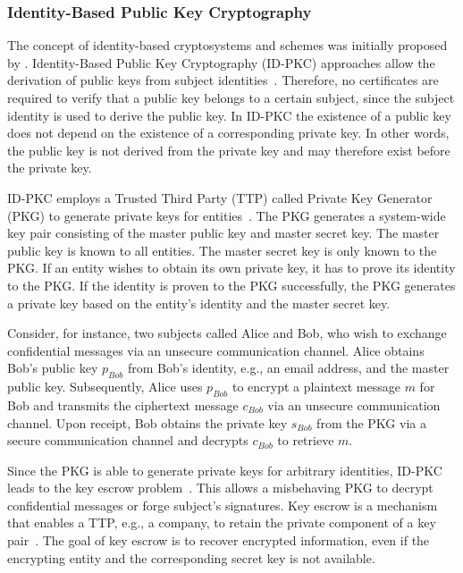 \subsubsection{Identity-Based Public Key Cryptography}
The concept of identity-based cryptosystems and schemes was initially proposed by \textcite{Shamir1985}.
Identity-Based Public Key Cryptography (ID-PKC) approaches allow the derivation of public keys from subject identities~\cite{Shamir1985,Boneh2023}.
Therefore, no certificates are required to verify that a public key belongs to a certain subject, since the subject identity is used to derive the public key.
In ID-PKC the existence of a public key does not depend on the existence of a corresponding private key.
In other words, the public key is not derived from the private key and may therefore exist before the private key.

ID-PKC employs a Trusted Third Party (TTP) called Private Key Generator (PKG) to generate private keys for entities~\cite{AlRiyami2003,Boneh2023}.
The PKG generates a system-wide key pair consisting of the master public key and master secret key.
The master public key is known to all entities.
The master secret key is only known to the PKG.
If an entity wishes to obtain its own private key, it has to prove its identity to the PKG.
If the identity is proven to the PKG successfully, the PKG generates a private key based on the entity's identity and the master secret key.

Consider, for instance, two subjects called Alice and Bob, who wish to exchange confidential messages via an unsecure communication channel.
Alice obtains Bob's public key $p_{Bob}$ from Bob's identity, e.g., an email address, and the master public key.
Subsequently, Alice uses $p_{Bob}$ to encrypt a plaintext message $m$ for Bob and transmits the ciphertext message $c_{Bob}$ via an unsecure communication channel.
Upon receipt, Bob obtains the private key $s_{Bob}$ from the PKG via a secure communication channel and decrypts $c_{Bob}$ to retrieve $m$.

Since the PKG is able to generate private keys for arbitrary identities, ID-PKC leads to the key escrow problem~\cite{AlRiyami2003}.
This allows a misbehaving PKG to decrypt confidential messages or forge subject's signatures.
Key escrow is a mechanism that enables a TTP, e.g., a company, to retain the private component of a key pair~\cite{CNSS2021,Boneh2023}.
The goal of key escrow is to recover encrypted information, even if the encrypting entity and the corresponding secret key is not available.

